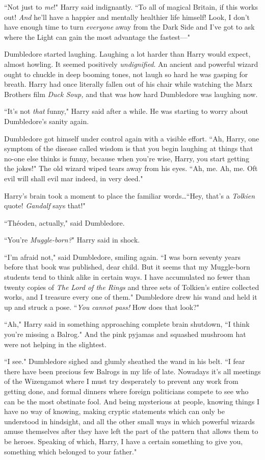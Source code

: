 ``Not just to \emph{me}!" Harry said indignantly. ``To all of magical Britain, if this works out! \emph{And} he'll have a happier and mentally healthier life himself! Look, I don't have enough time to turn \emph{everyone} away from the Dark Side and I've got to ask where the Light can gain the most advantage the fastest—"

Dumbledore started laughing. Laughing a lot harder than Harry would expect, almost howling. It seemed positively \emph{undignified}. An ancient and powerful wizard ought to chuckle in deep booming tones, not laugh so hard he was gasping for breath. Harry had once literally fallen out of his chair while watching the Marx Brothers film \emph{Duck Soup,} and that was how hard Dumbledore was laughing now.

``It's not \emph{that} funny," Harry said after a while. He was starting to worry about Dumbledore's sanity again.

Dumbledore got himself under control again with a visible effort. ``Ah, Harry, one symptom of the disease called wisdom is that you begin laughing at things that no-one else thinks is funny, because when you're wise, Harry, you start getting the jokes!" The old wizard wiped tears away from his eyes. ``Ah, me. Ah, me. Oft evil will shall evil mar indeed, in very deed."

Harry's brain took a moment to place the familiar words…``Hey, that's a \emph{Tolkien} quote! \emph{Gandalf} says that!"

``Théoden, actually," said Dumbledore.

``You're \emph{Muggle-born?}" Harry said in shock.

``I'm afraid not," said Dumbledore, smiling again. ``I was born seventy years before that book was published, dear child. But it seems that my Muggle-born students tend to think alike in certain ways. I have accumulated no fewer than twenty copies of \emph{The Lord of the Rings} and three sets of Tolkien's entire collected works, and I treasure every one of them." Dumbledore drew his wand and held it up and struck a pose. ``\emph{You cannot pass!} How does that look?"

``Ah," Harry said in something approaching complete brain shutdown, ``I think you're missing a Balrog." And the pink pyjamas and squashed mushroom hat were not helping in the slightest.

``I see." Dumbledore sighed and glumly sheathed the wand in his belt. ``I fear there have been precious few Balrogs in my life of late. Nowadays it's all meetings of the Wizengamot where I must try desperately to prevent any work from getting done, and formal dinners where foreign politicians compete to see who can be the most obstinate fool. And being mysterious at people, knowing things I have no way of knowing, making cryptic statements which can only be understood in hindsight, and all the other small ways in which powerful wizards amuse themselves after they have left the part of the pattern that allows them to be heroes. Speaking of which, Harry, I have a certain something to give you, something which belonged to your father."

